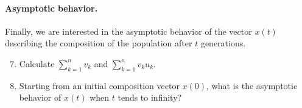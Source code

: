 \paragraph{Asymptotic behavior.}
Finally, we are interested in the asymptotic behavior of the vector $x(t)$ describing the composition of the population after $t$ generations.
\begin{enumerate}
  \setcounter{enumi}{6}
  \item Calculate $\sum_{k=1}^n v_k$ and $\sum_{k=1}^n v_k u_k$.
  \item Starting from an initial composition vector $x(0)$, what is the asymptotic behavior of $x(t)$ when $t$ tends to infinity?
\end{enumerate}
